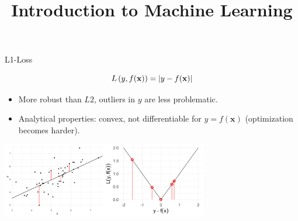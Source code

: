 \documentclass[11pt,compress,t,notes=noshow, xcolor=table]{beamer}
\title{Introduction to Machine Learning}
\institute{\href{https://compstat-lmu.github.io/lecture_i2ml/}{compstat-lmu.github.io/lecture\_i2ml}}
\date{}
\begin{document}


\begin{vbframe}{L1-Loss}

\vspace*{-0.3cm}

$$
L\left(y, f(\mathbf{x})\right) = \left|y-f(\mathbf{x})\right|
$$

\begin{itemize}
\item More robust than $L2$, outliers in $y$ are less problematic.
\item Analytical properties: convex, not differentiable for $y = f(\bm{x})$ (optimization becomes harder).
\end{itemize}

\begin{center}
  \includegraphics[width = 9cm]{figure/loss_absolute_2.png} \\
\end{center}


\end{vbframe}
\end{document}
